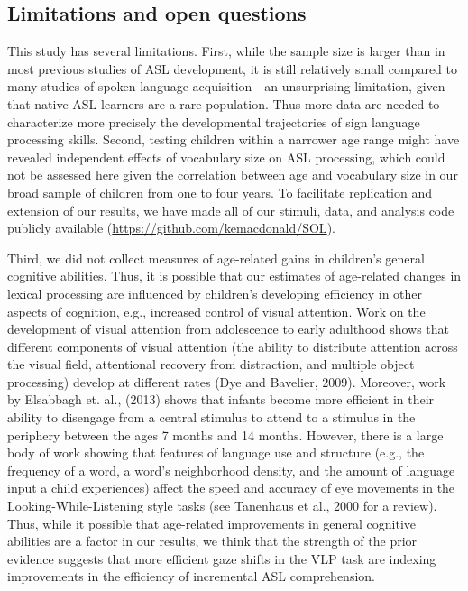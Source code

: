 \documentclass[oneside]{report}
\begin{document}
\subsection{Limitations and open
questions}\label{limitations-and-open-questions}

This study has several limitations. First, while the sample size is
larger than in most previous studies of ASL development, it is still
relatively small compared to many studies of spoken language acquisition
- an unsurprising limitation, given that native ASL-learners are a rare
population. Thus more data are needed to characterize more precisely the
developmental trajectories of sign language processing skills. Second,
testing children within a narrower age range might have revealed
independent effects of vocabulary size on ASL processing, which could
not be assessed here given the correlation between age and vocabulary
size in our broad sample of children from one to four years. To
facilitate replication and extension of our results, we have made all of
our stimuli, data, and analysis code publicly available
(\url{https://github.com/kemacdonald/SOL}).

Third, we did not collect measures of age-related gains in children's
general cognitive abilities. Thus, it is possible that our estimates of
age-related changes in lexical processing are influenced by children's
developing efficiency in other aspects of cognition, e.g., increased
control of visual attention. Work on the development of visual attention
from adolescence to early adulthood shows that different components of
visual attention (the ability to distribute attention across the visual
field, attentional recovery from distraction, and multiple object
processing) develop at different rates (Dye and Bavelier, 2009).
Moreover, work by Elsabbagh et. al., (2013) shows that infants become
more efficient in their ability to disengage from a central stimulus to
attend to a stimulus in the periphery between the ages 7 months and 14
months. However, there is a large body of work showing that features of
language use and structure (e.g., the frequency of a word, a word's
neighborhood density, and the amount of language input a child
experiences) affect the speed and accuracy of eye movements in the
Looking-While-Listening style tasks (see Tanenhaus et al., 2000 for a
review). Thus, while it possible that age-related improvements in
general cognitive abilities are a factor in our results, we think that
the strength of the prior evidence suggests that more efficient gaze
shifts in the VLP task are indexing improvements in the efficiency of
incremental ASL comprehension.
\end{document}
